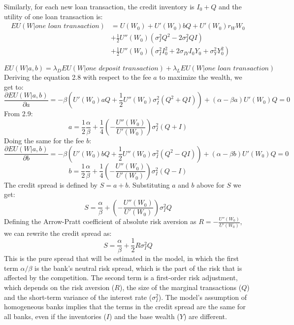 Similarly, for each new loan transaction, the credit inventory is $I_0 + Q$ and the utility of one loan transaction is:
\begin{equation}
  \begin{aligned}
    EU(W|\textit{one loan transaction}) &= U(W_0) + U'(W_0)bQ +  U'(W_0)r_W W_0 \\ &+ \frac{1}{2}U''(W_0)(\sigma_I^2 Q^2 - 2\sigma_I^2 QI) \\ &+\frac{1}{2}U''(W_0)(\sigma_I^2 I_0^2 + 2\sigma_{IY} I_0 Y_0 + \sigma_Y^2 Y_0^2)
  \end{aligned}
\end{equation}

\begin{equation}
  EU(W|a,b) = \lambda_D EU(W|\textit{one deposit transaction}) + \lambda_L EU(W|\textit{one loan transaction})
\end{equation}
Deriving the equation 2.8 with respect to the fee $a$ to maximize the wealth, we get to:
\begin{equation}
  \frac{\partial EU(W|a,b)}{\partial a} = -\beta \left( U'(W_0)aQ +\frac{1}{2} U''(W_0)\sigma_I^2 (Q^2 + QI) \right) + (\alpha - \beta a) U'(W_0)Q = 0
\end{equation}
From 2.9:
\begin{equation}
  a = \frac{1}{2} \frac{\alpha}{\beta} + \frac{1}{4} \left(-\frac{U''(W_0)}{U'(W_0)}\right) \sigma_I^2(Q + I)
\end{equation}
Doing the same for the fee $b$:
\begin{equation}
  \frac{\partial EU(W|a,b)}{\partial b} = -\beta \left( U'(W_0)bQ +\frac{1}{2} U''(W_0)\sigma_I^2 (Q^2 - QI) \right) + (\alpha - \beta b) U'(W_0)Q = 0
\end{equation}
\begin{equation}
  b = \frac{1}{2} \frac{\alpha}{\beta} + \frac{1}{4} \left(-\frac{U''(W_0)}{U'(W_0)}\right) \sigma_I^2(Q - I)
\end{equation}
The credit spread is defined by $S=a+b$. Substituting $a$ and $b$ above for $S$ we get:
\begin{equation}
  S = \frac{\alpha}{\beta} + \left(-\frac{U''(W_0)}{U'(W_0)}\right) \sigma_I^2Q
\end{equation}
Defining the Arrow-Pratt coefficient of absolute risk aversion as $R = -\frac{U''(W_0)}{U'(W_0)}$, we can rewrite the credit spread as:
\begin{equation}
  S = \frac{\alpha}{\beta} + \frac{1}{2} R \sigma_I^2 Q
\end{equation}
This is the pure spread that will be estimated in the model, in which the first term $\alpha/\beta$ is the bank's neutral risk spread, which is the part of the risk that is affected by the competition. The second term is a first-order risk adjustment, which depends on the risk aversion ($R$), the size of the marginal transactions ($Q$) and the short-term variance of the interest rate ($\sigma_I^2$). The model's assumption of homogeneous banks implies that the terms in the credit spread are the same for all banks, even if the inventories ($I$) and the base wealth ($Y$) are different. 

